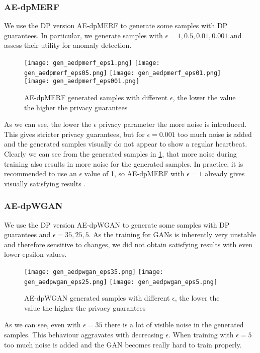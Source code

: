 \subsubsection*{AE-dpMERF}
We use the DP version AE-dpMERF to generate some samples with DP guarantees. In particular, we generate samples with $\epsilon=1, 0.5, 0.01, 0.001$ and assess their utility for anomaly detection.

\begin{figure}[H]
    \centering
    \texttt{[image: gen\_aedpmerf\_eps1.png]}
    \texttt{[image: gen\_aedpmerf\_eps05.png]}
    \texttt{[image: gen\_aedpmerf\_eps01.png]}
    \texttt{[image: gen\_aedpmerf\_eps001.png]}
    \caption{AE-dpMERF generated samples with different $\epsilon$, the lower the value the higher the privacy guarantees}
    \label{fig:gen_aedpmerf}
\end{figure}

As we can see, the lower the $\epsilon$ privacy parameter the more noise is introduced. This gives stricter privacy guarantees, but for $\epsilon=0.001$ too much noise is added and the generated samples visually do not appear to show a regular heartbeat. Clearly we can see from the generated samples in \cref{fig:gen_aedpmerf}, that more noise during training also results in more noise for the generated samples.  In practice, it is recommended to use an $\epsilon$ value of 1, so AE-dpMERF with $\epsilon=1$ already gives visually satisfying results \parencite{dwork2019differential}.

\subsubsection*{AE-dpWGAN}
We use the DP version AE-dpWGAN to generate some samples with DP guarantees and $\epsilon=35, 25, 5$. As the training for GANs is inherently very unstable and therefore sensitive to changes, we did not obtain satisfying results with even lower epsilon values. 

\begin{figure}[H]
    \centering
    \texttt{[image: gen\_aedpwgan\_eps35.png]}
    \texttt{[image: gen\_aedpwgan\_eps25.png]}
    \texttt{[image: gen\_aedpwgan\_eps5.png]}
    \caption{AE-dpWGAN generated samples with different $\epsilon$, the lower the value the higher the privacy guarantees}
\end{figure}

As we can see, even with $\epsilon=35$ there is a lot of visible noise in the generated samples. This behaviour aggravates with decreasing $\epsilon$. When training with $\epsilon=5$ too much noise is added and the GAN becomes really hard to train properly. 

